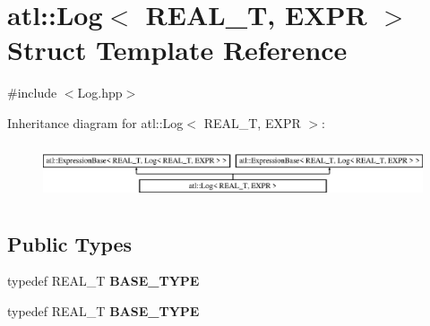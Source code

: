 \hypertarget{structatl_1_1_log}{\section{atl\+:\+:Log$<$ R\+E\+A\+L\+\_\+\+T, E\+X\+P\+R $>$ Struct Template Reference}
\label{structatl_1_1_log}
}


{\ttfamily \#include $<$Log.\+hpp$>$}

Inheritance diagram for atl\+:\+:Log$<$ R\+E\+A\+L\+\_\+\+T, E\+X\+P\+R $>$\+:\begin{figure}[H]
\begin{center}
\leavevmode
\includegraphics[height=1.642229cm]{structatl_1_1_log}
\end{center}
\end{figure}
\subsection*{Public Types}
\begin{DoxyCompactItemize}
\item 
\hypertarget{structatl_1_1_log_aa92eedd84c7f7136b0c5b609b494468e}{typedef R\+E\+A\+L\+\_\+\+T {\bfseries B\+A\+S\+E\+\_\+\+T\+Y\+P\+E}}\label{structatl_1_1_log_aa92eedd84c7f7136b0c5b609b494468e}

\item 
\hypertarget{structatl_1_1_log_aa92eedd84c7f7136b0c5b609b494468e}{typedef R\+E\+A\+L\+\_\+\+T {\bfseries B\+A\+S\+E\+\_\+\+T\+Y\+P\+E}}\label{structatl_1_1_log_aa92eedd84c7f7136b0c5b609b494468e}

\end{DoxyCompactItemize}
